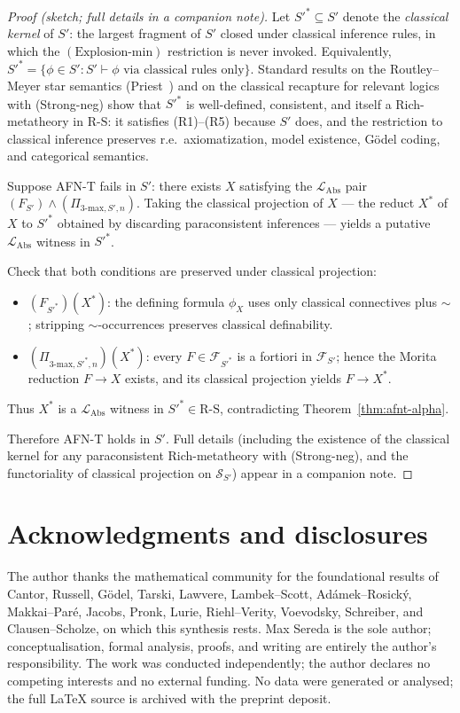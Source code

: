 \documentclass[11pt]{article}
\theoremstyle{plain}
\theoremstyle{definition}
\newcommand{\RS}{\mathrm{R\text{-}S}}
\newcommand{\cS}{\mathcal{S}}
\newcommand{\cF}{\mathcal{F}}
\newcommand{\LAbs}{\mathcal{L}_{\mathrm{Abs}}}
\begin{document}
\begin{proof}[Proof (sketch; full details in a companion note)]

Let $S'^* \subseteq S'$ denote the \emph{classical kernel} of $S'$: the largest fragment of $S'$ closed under classical inference rules, in which the $(\text{Explosion-min})$ restriction is never invoked. Equivalently, $S'^* = \{\phi \in S' : S' \vdash \phi \text{ via classical rules only}\}$. Standard results on the Routley--Meyer star semantics (Priest~\cite{Priest2006}) and on the classical recapture for relevant logics with (Strong-neg) show that $S'^*$ is well-defined, consistent, and itself a Rich-metatheory in $\RS$: it satisfies (R1)--(R5) because $S'$ does, and the restriction to classical inference preserves r.e.\ axiomatization, model existence, G\"odel coding, and categorical semantics.

Suppose AFN-T fails in $S'$: there exists $X$ satisfying the $\LAbs$ pair $(F_{S'}) \wedge (\Pi_{3\text{-max}, S', n})$. Taking the classical projection of $X$ --- the reduct $X^*$ of $X$ to $S'^*$ obtained by discarding paraconsistent inferences --- yields a putative $\LAbs$ witness in $S'^*$.

Check that both conditions are preserved under classical projection:
\begin{itemize}
\item $(F_{S'^*})(X^*)$: the defining formula $\phi_X$ uses only classical connectives plus $\sim$; stripping $\sim$-occurrences preserves classical definability.
\item $(\Pi_{3\text{-max}, S'^*, n})(X^*)$: every $F \in \cF_{S'^*}$ is a fortiori in $\cF_{S'}$; hence the Morita reduction $F \to X$ exists, and its classical projection yields $F \to X^*$.
\end{itemize}

Thus $X^*$ is a $\LAbs$ witness in $S'^* \in \RS$, contradicting Theorem~\ref{thm:afnt-alpha}.

Therefore AFN-T holds in $S'$. Full details (including the existence of the classical kernel for any paraconsistent Rich-metatheory with (Strong-neg), and the functoriality of classical projection on $\cS_{S'}$) appear in a companion note.
\end{proof}

\section*{Acknowledgments and disclosures}

The author thanks the mathematical community for the foundational results of Cantor, Russell, G\"odel, Tarski, Lawvere, Lambek--Scott, Ad\'amek--Rosick\'y, Makkai--Par\'e, Jacobs, Pronk, Lurie, Riehl--Verity, Voevodsky, Schreiber, and Clausen--Scholze, on which this synthesis rests. Max Sereda is the sole author; conceptualisation, formal analysis, proofs, and writing are entirely the author's responsibility. The work was conducted independently; the author declares no competing interests and no external funding. No data were generated or analysed; the full LaTeX source is archived with the preprint deposit.
\end{document}
